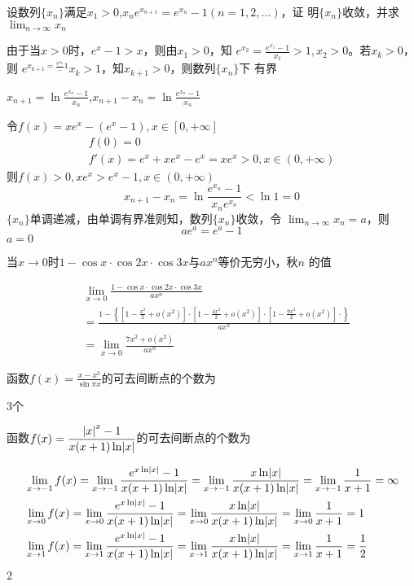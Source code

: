 \documentclass{article}
\begin{document}
\begin{examplle}[]
设数列\(\{x_n\}\)满足\(x_1>0\),\(x_ne^{x_{n+1}}=e^{x_n}-1(n=1,2,\dots)\)，证
明\(\{x_n\}\)收敛，并求\(\displaystyle\lim_{n\to\infty}x_n\)

由于当\(x>0\)时，\(e^x-1>x\)，则由\(x_1>0\)，知
\(e^{x_2}=\frac{e^{x_1}-1}{x_1}>1,x_2>0\)。若\(x_k>0\)，则
\(e^{x_{k+1}=\frac{e^{x_k}}-1}{x_k}>1\)，知\(x_{k+1}>0\)，则数列\(\{x_n\}\)下
有界

\(x_{n+1}=\ln\frac{e^{x_n}-1}{x_n}\),\(x_{n+1}-x_n=\ln\frac{e^{x_n}-1}{x_n}\)

令\(f(x)=xe^x-(e^x-1),x\in[0,+\infty]\)
\begin{gather*}
f(0)=0\\
f'(x)=e^x+xe^x-e^x=xe^x>0,x\in(0,+\infty)
\end{gather*}
则\(f(x)>0,xe^x>e^x-1,x\in(0,+\infty)\)
\begin{equation*}
x_{n+1}-x_n=\ln\frac{e^{x_n}-1}{x_ne^{x_n}}<\ln1=0
\end{equation*}
\(\{x_n\}\)单调递减，由单调有界准则知，数列\(\{x_n\}\)收敛，令
\(\displaystyle\lim_{n\to\infty}x_n=a\)，则
\begin{equation*}
ae^a=e^a-1
\end{equation*}
\(a=0\)
\end{examplle}

\begin{examplle}[]
当\(x\to0\)时\(1-\cos x\cdot\cos 2x\cdot\cos3x\)与\(ax^n\)等价无穷小，秋\(n\)
的值

\begin{align*}
&\lim_{x\to0}\frac{1-\cos x\cdot\cos2x\cdot\cos3x}{ax^n}\\
&=\frac{1-\left\{
\left[1-\frac{x^2}{2}+o(x^2)\right]\cdot
\left[1-\frac{4x^2}{2}+o(x^2)\right]\cdot
\left[1-\frac{9x^2}{2}+o(x^2)\right]\cdot
\right\}}{ax^n}\\
&=\lim_{x\to0}\frac{7x^2+o(x^2)}{ax^n}
\end{align*}
\end{examplle}

\begin{examplle}[]
函数\(f(x)=\frac{x-x^3}{\sin\pi x}\)的可去间断点的个数为

3个
\end{examplle}

\begin{examplle}[]
函数\(f(x)=\displaystyle\frac{\abs{x}^x-1}{x(x+1)\ln\abs{x}}\)的可去间断点的个数为

\begin{align*}
&\lim_{x\to-1}f(x)=\lim_{x\to-1}\frac{e^{x\ln\abs{x}}-1}{x(x+1)\ln\abs{x}}=
\lim_{x\to-1}\frac{x\ln\abs{x}}{x(x+1)\ln\abs{x}}=\lim_{x\to-1}\frac{1}{x+1}=
\infty\\
&\lim_{x\to0}f(x)=\lim_{x\to0}\frac{e^{x\ln\abs{x}}-1}{x(x+1)\ln\abs{x}}=
\lim_{x\to0}\frac{x\ln\abs{x}}{x(x+1)\ln\abs{x}}=\lim_{x\to0}\frac{1}{x+1}=1\\
&\lim_{x\to1}f(x)=\lim_{x\to1}\frac{e^{x\ln\abs{x}}-1}{x(x+1)\ln\abs{x}}=
\lim_{x\to1}\frac{x\ln\abs{x}}{x(x+1)\ln\abs{x}}=\lim_{x\to1}\frac{1}{x+1}=\frac{1}{2}
\end{align*}
2
\end{examplle}
\end{document}
